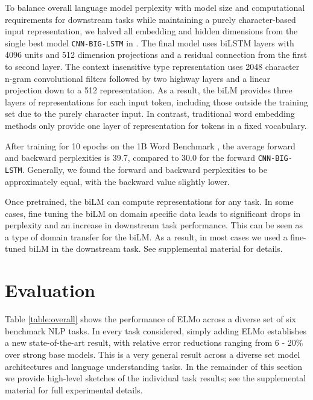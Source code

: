 \documentclass[11pt,a4paper]{article}
\newcommand{\ELMO}{ELMo}
\begin{document}
To balance overall language model perplexity with model size and computational requirements for downstream tasks while maintaining a purely character-based input representation, we halved all embedding and hidden dimensions from the single best model \texttt{CNN-BIG-LSTM} in \citet{Jzefowicz2016ExploringTL}.
The final model uses  biLSTM layers with 4096 units and 512 dimension projections and a residual connection from the first to second layer.
The context insensitive type representation uses 2048 character n-gram convolutional filters followed by two highway layers \citep{Srivastava2015TrainingVD} and a linear projection down to a 512 representation.
As a result, the biLM provides three layers of representations for each input token, including those outside the training set due to the purely character input.
In contrast, traditional word embedding methods only provide one layer of representation for tokens in a fixed vocabulary.


After training for 10 epochs on the 1B Word Benchmark \citep{Chelba2014OneBW}, the average forward and backward perplexities is 39.7, compared to 30.0 for the forward \texttt{CNN-BIG-LSTM}.
Generally, we found the forward and backward perplexities to be approximately equal, with the backward value slightly lower.

Once pretrained, the biLM can compute representations for any task.
In some cases, fine tuning the biLM on domain specific data leads to significant drops in perplexity and an increase in downstream task performance.
This can be seen as a type of domain transfer for the biLM.
As a result, in most cases we used a fine-tuned biLM in the downstream task.
See supplemental material for details.




\section{Evaluation}
\label{sec:results}
Table \ref{table:overall} shows the performance of \ELMO{} across a diverse set of six benchmark NLP tasks.
In every task considered, simply adding \ELMO{} establishes a new state-of-the-art result, with relative error reductions ranging from 6 - 20\% over strong base models.
This is a very general result across a diverse set model architectures and language understanding tasks.
In the remainder of this section we provide high-level sketches of the individual task results; see the supplemental material for full experimental details.
\end{document}
